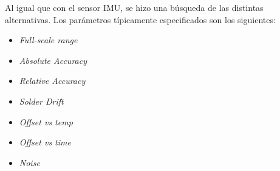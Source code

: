 





Al igual que con el sensor IMU, se hizo una búsqueda de las distintas alternativas. Los parámetros típicamente especificados son los siguientes:

\begin{itemize}
    \item \textit{Full-scale range}
    \item \textit{Absolute Accuracy}
    \item \textit{Relative Accuracy}
    \item \textit{Solder Drift}
    \item \textit{Offset vs temp}
    \item \textit{Offset vs time}
    \item \textit{Noise}
\end{itemize}

